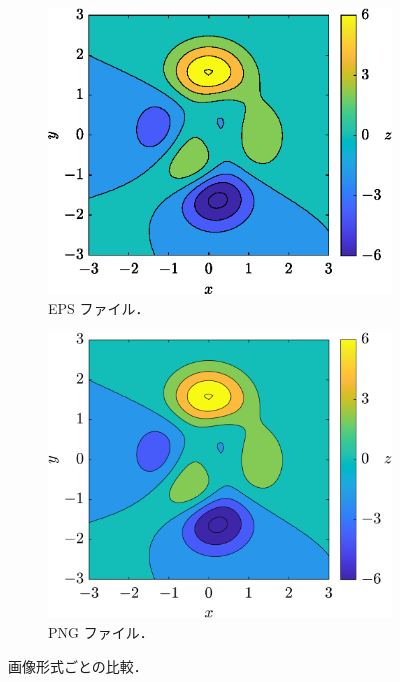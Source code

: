 \begin{figure}[tp]
    \vspace{5mm} %
    \begin{subfigure}{0.45\columnwidth}
        \centering
        \includegraphics[width=\columnwidth]{figure/comparison1-3.eps}
        \caption{EPS ファイル．}
        \label{subfig:figcomp1_eps}
    \end{subfigure}
    \hfill %
    \begin{subfigure}{0.45\columnwidth}
        \centering
        \includegraphics[width=\columnwidth]{figure/comparison1-4.png}
        \caption{PNG ファイル．}
        \label{subfig:figcomp1_png}
    \end{subfigure}
    \caption{画像形式ごとの比較．}
    \label{fig:figure_comparison1}
\end{figure}

